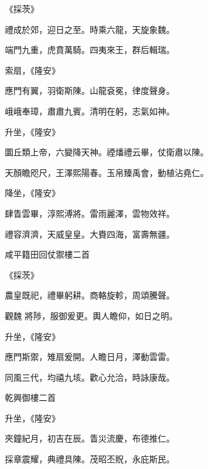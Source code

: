 \begin{pinyinscope}
 《採茨》



 禮成於郊，迎日之至。時乘六龍，天旋象魏。



 端門九重，虎賁萬騎。四夷來王，群后輯瑞。



 索扇，《隆安》



 應門有翼，羽衛斯陳。山龍袞冕，律度聲身。



 峨峨奉璋，肅肅九賓。清明在躬，志氣如神。



 升坐，《隆安》



 圜丘類上帝，六變降天神。禋燔禮云畢，仗衛肅以陳。



 天顏瞻咫尺，王澤熙陽春。玉帛臻禹會，動植沾堯仁。



 降坐，《隆安》



 肆眚雲畢，淳熙溥將。雷雨麗澤，雲物效祥。



 禮容濟濟，天威皇皇。大賚四海，富壽無疆。



 咸平籍田回仗禦樓二首



 《採茨》



 農皇既祀，禮畢躬耕。商輅旋軫，周頌騰聲。



 觀魏
 將陟，服御爰更。輿人瞻仰，如日之明。



 升坐，《隆安》



 應門斯禦，雉扇爰開。人瞻日月，澤動雲雷。



 同風三代，均禧九垓。歡心允洽，時詠康哉。



 乾興御樓二首



 升坐，《隆安》



 夾鐘紀月，初吉在辰。眚災流慶，布德推仁。



 採章震耀，典禮具陳。茂昭丕貺，永庇斯民。




\end{pinyinscope}
